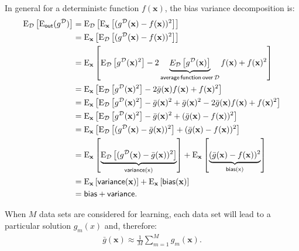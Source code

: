 \documentclass{tufte-handout}
\begin{document}
			
In general for a deterministc function  $f(\mathbf x)$, the bias variance decomposition is:
\begin{align*}
\mathrm E_{\mathcal D} \left[ \mathrm E_{\sf out} (g^{\mathcal D}) \right]&=  \mathrm E_{\mathcal D}\left[\mathrm E_{\mathbf x}\left[ (g^{\mathcal D}(\mathbf x) -f(\mathbf x))^2 \right] \right]\\
&= \mathrm E_{\mathbf x}\left[\mathrm E_{\mathcal D}\left[ (g^{\mathcal D}(\mathbf x) -f(\mathbf x))^2 \right] \right]\\
&= \mathrm E_{\mathbf x}\left[\mathrm E_{\mathcal D}\left[ g^{\mathcal D}(\mathbf x)^2\right] -  2 \underbrace{E_{\mathcal D}\left[ g^{\mathcal D}(\mathbf x)\right]}_{\mathsf{average \, function\,over\, \mathcal D}}f(\mathbf x)  + f(\mathbf x)^2  \right]\\
&= \mathrm E_{\mathbf x}\left[\mathrm E_{\mathcal D}\left[ g^{\mathcal D}(\mathbf x)^2\right] -  2 \bar{g}(\mathbf x)f(\mathbf x)  + f(\mathbf x)^2  \right]\\
&= \mathrm E_{\mathbf x}\left[\mathrm E_{\mathcal D}\left[ g^{\mathcal D}(\mathbf x)^2\right] - \bar{g}(\mathbf x)^2 + \bar{g}(\mathbf x)^2 - 2 \bar{g}(\mathbf x)f(\mathbf x)  + f(\mathbf x)^2  \right]\\
&= \mathrm E_{\mathbf x}\left[\mathrm E_{\mathcal D}\left[ g^{\mathcal D}(\mathbf x)^2\right] - \bar{g}(\mathbf x)^2 +   (\bar{g}(\mathbf x) - f(\mathbf x))^2  \right]\\
&= \mathrm E_{\mathbf x}\left[\mathrm E_{\mathcal D}\left[ (g^{\mathcal D}(\mathbf x)  - \bar{g}(\mathbf x))^2\right] +   (\bar{g}(\mathbf x) - f(\mathbf x))^2  \right]\\
&= \mathrm E_{\mathbf x}\left[ \underbrace{\mathrm E_{\mathcal D}\left[ (g^{\mathcal D}(\mathbf x)  - \bar{g}(\mathbf x))^2\right]}_{\mathsf{variance(x)}}\right]  +  \mathrm E_{\mathbf x} \left[ \underbrace{ (\bar{g}(\mathbf x) - f(\mathbf x))^2}_{\mathsf{bias(x)}} \right] \\\
&=  \mathrm E_{\mathbf x}\left[ \mathsf{variance(\mathbf x)}  \right] + \mathrm E_{\mathbf x}\left[ \mathsf{bias(\mathbf x)}  \right]\\
&= \mathsf{bias + variance}.
\end{align*}

When $M$ data sets are considered for learning, each data set will lead to a particular solution $g_m(x)$ and, therefore:
\begin{align*}
\bar{g}(\mathbf x) \approx \frac{1}{M}\sum_{m=1}^M g_m(\mathbf x).
\end{align*}
\end{document}
